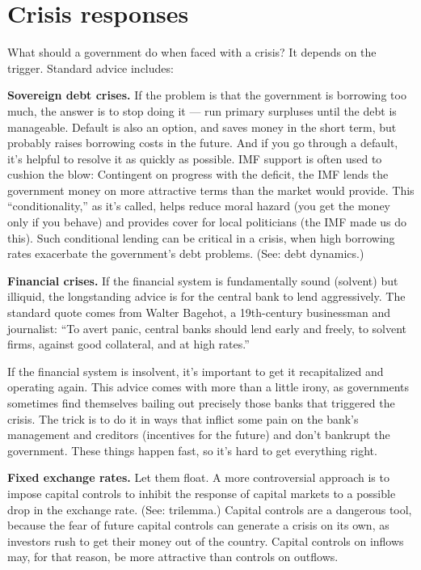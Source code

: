 \section{Crisis responses}

What should a government do when faced with a crisis?
It depends on the trigger.
Standard advice includes:

\textbf{Sovereign debt crises.}
If the problem is that the government is borrowing too much,
the answer is to stop doing it --- run primary surpluses until the debt is manageable.
Default is also an option, and saves money in the short term,
but probably raises borrowing costs in the future.
And if you go through a default, it's helpful to resolve it as quickly as possible.
IMF support is often used to cushion the blow: Contingent on progress with the deficit,
the IMF lends the government money on more attractive terms
than the market would provide.
This ``conditionality,'' as it's called,
helps reduce moral hazard (you get the money only if you behave)
and provides cover for local politicians (the IMF made us do this).
Such conditional lending can be critical in a crisis,
when high borrowing rates exacerbate the government's debt problems.
(See:  debt dynamics.)


\textbf{Financial crises.}
If the financial system is fundamentally sound (solvent) but illiquid,
the longstanding advice is for the central bank to lend aggressively.
The standard quote comes from Walter Bagehot,
a 19th-century businessman and journalist:
``To avert panic, central banks should lend early and freely,
to solvent firms, against good collateral, and at high rates.''


If the financial system is insolvent,
it's important to get it recapitalized and operating again.
This advice comes with more than a little irony,
as governments sometimes find themselves bailing out
precisely those banks that triggered the crisis.
The trick is to do it in ways that inflict some pain
on the bank's management and creditors
(incentives for the future) and don't bankrupt the government.
These things happen fast, so it's hard to get everything right.


\textbf{Fixed exchange rates.} Let them float.
A more controversial approach is to impose capital controls to inhibit the
response of capital markets to a possible drop in the exchange rate.
(See:  trilemma.)
Capital controls are a dangerous tool,
because the fear of future capital controls
can generate a crisis on its own,
as investors rush to get their money out of the country.
Capital controls on inflows may, for that reason, be more attractive
than controls on outflows.



